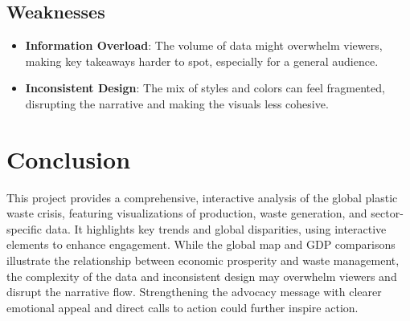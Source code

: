 \documentclass{article}
\begin{document}
\subsection*{Weaknesses}
\begin{itemize}
    \item \textbf{Information Overload}: The volume of data might overwhelm viewers, making key takeaways harder to spot, especially for a general audience.
    \item \textbf{Inconsistent Design}: The mix of styles and colors can feel fragmented, disrupting the narrative and making the visuals less cohesive.
\end{itemize}

\section{Conclusion}

This project provides a comprehensive, interactive analysis of the global plastic waste crisis, featuring visualizations of production, waste generation, and sector-specific data. It highlights key trends and global disparities, using interactive elements to enhance engagement. While the global map and GDP comparisons illustrate the relationship between economic prosperity and waste management, the complexity of the data and inconsistent design may overwhelm viewers and disrupt the narrative flow. Strengthening the advocacy message with clearer emotional appeal and direct calls to action could further inspire action.

\newpage

\begin{refcontext}[sorting=nyt]
\printbibliography
\end{refcontext}
\end{document}
